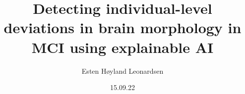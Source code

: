 \documentclass[t]{beamer}
\author{Esten H{\o}yland Leonardsen}
\institute[Life Science, UiO]{UiO:Life Science, University of Oslo}
\date{15.09.22}
\title{Detecting individual-level deviations in brain morphology in MCI using explainable AI}
\begin{document}
	\newcommand{\N}{100}












\end{document}
